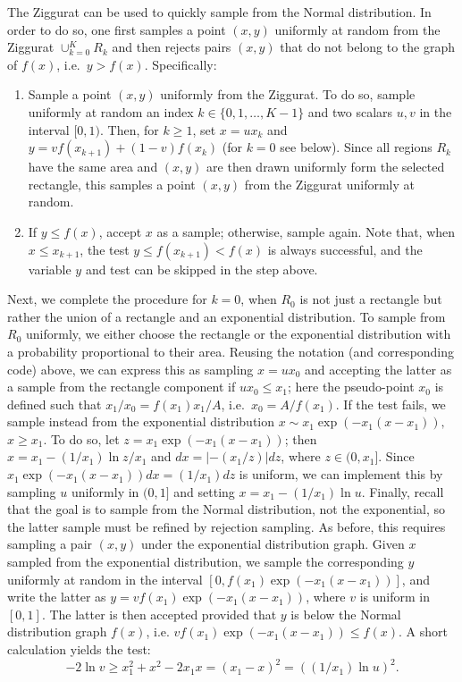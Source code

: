 The Ziggurat can be used to quickly sample from the Normal distribution. In order to do so, one first samples a point $(x,y)$ uniformly at random from the Ziggurat $\cup_{k=0}^K R_k$ and then rejects pairs $(x,y)$ that do not belong to the graph of $f(x)$, i.e.\ $y > f(x)$. Specifically:
\begin{enumerate}
	\item Sample a point $(x,y)$ uniformly from the Ziggurat. To do so, sample uniformly at random an index $k \in\{0,1,\dots,K-1\}$ and two scalars $u,v$ in the interval $[0,1)$. Then, for $k\geq 1$, set $x = u x_k$ and $y = v f(x_{k+1}) + (1-v)f(x_k)$ (for $k=0$ see below). Since all regions $R_k$ have the same area and $(x,y)$ are then drawn uniformly form the selected rectangle, this samples a point $(x,y)$ from the Ziggurat uniformly at random.
	\item If $y \leq f(x)$, accept $x$ as a sample; otherwise, sample again. Note that, when $x \leq x_{k+1}$, the test $y \leq f(x_{k+1}) < f(x)$ is always successful, and the variable $y$ and test can be skipped in the step above.
\end{enumerate}
Next, we complete the procedure for $k=0$, when $R_0$ is not just a rectangle but rather the union of a rectangle and an exponential distribution. To sample from $R_0$ uniformly, we either choose the rectangle or the exponential distribution with a probability proportional to their area. Reusing the notation (and corresponding code) above, we can express this as sampling $x = u x_0$ and accepting the latter as a sample from the rectangle component if $ux_0 \leq x_1$; here the pseudo-point $x_0$ is defined such that $x_1 / x_0 = f(x_1)x_1 / A$, i.e.\ $x_0 = A/f(x_1)$. If the test fails, we sample instead from the exponential distribution $x\sim x_1\exp(-x_1(x-x_1)),$ $x\geq x_1$. To do so, let $z= x_1\exp(-x_1(x-x_1))$; then $x = x_1 - (1/x_1) \ln z/x_1$ and $dx = |- (x_1/z)|dz$, where $z\in(0,x_1]$. Since $x_1\exp(-x_1(x-x_1)) dx = (1/x_1) dz$ is uniform, we can implement this by sampling $u$ uniformly in $(0,1]$ and setting $x = x_1 - (1/x_1) \ln u$. Finally, recall that the goal is to sample from the Normal distribution, not the exponential, so the latter sample must be refined by rejection sampling. As before, this requires sampling a pair $(x,y)$ under the exponential distribution graph. Given $x$ sampled from the exponential distribution, we sample the corresponding $y$ uniformly at random in the interval $[0, f(x_1) \exp(-x_1(x-x_1))]$, and write the latter as $y = v f(x_1) \exp(-x_1(x-x_1))$, where $v$ is uniform in $[0,1]$. The latter is then accepted provided that $y$ is below the Normal distribution graph $f(x)$, i.e. $v f(x_1) \exp(-x_1(x-x_1)) \leq f(x).$ A short calculation yields the test:
\[
-2\ln v \geq x_1^2 +  x^2 - 2x_1x = (x_1 - x)^2 =
((1/x_1) \ln u)^2.
\]

